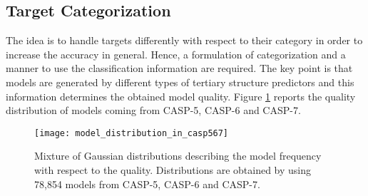 \subsection{Target Categorization}
\label{subsec:target_categorization}
The idea is to handle targets differently with respect to their category in order to increase the accuracy in general. Hence, a formulation of categorization and a manner to use the classification information are required. The key point is that models are generated by different types of tertiary structure predictors and this information determines the obtained model quality. Figure \ref{fig:model_distribution_in_casp567} reports the quality distribution of models coming from CASP-5, CASP-6 and CASP-7.
\begin{figure}[tb]
	\begin{center}
		\texttt{[image: model\_distribution\_in\_casp567]}
		\caption[Mixture of Gaussian distributions describing the model frequency with respect to the quality]{Mixture of Gaussian distributions describing the model frequency with respect to the quality. Distributions are obtained by using 78,854 models from CASP-5, CASP-6 and CASP-7.}		
		\label{fig:model_distribution_in_casp567}
	\end{center}
\end{figure}
